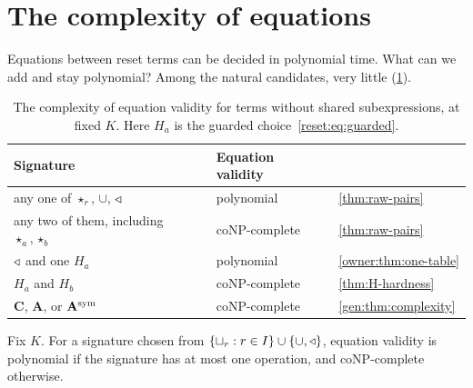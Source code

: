 \section{The complexity of equations}\label{sec:complexity}

Equations between reset terms can be decided in polynomial time. What can we add and stay polynomial? Among the natural candidates, very little (\cref{tab:complexity}).

\begin{table}[ht]
\centering
\begin{tabular}{lll}
\toprule
Signature & Equation validity & \\
\midrule
any one of $\star_r$, $\cup$, $\mathbin{\triangleleft}$ & polynomial & \cref{thm:raw-pairs}\\
any two of them, including $\star_a,\star_b$ & coNP-complete & \cref{thm:raw-pairs}\\
$\mathbin{\triangleleft}$ and one $H_a$ & polynomial & \cref{owner:thm:one-table}\\
$H_a$ and $H_b$ & coNP-complete & \cref{thm:H-hardness}\\
$\mathbf C$, $\mathbf A$, or $\mathbf A^{\rm sym}$ & coNP-complete & \cref{gen:thm:complexity}\\
\bottomrule
\end{tabular}
\caption{The complexity of equation validity for terms without shared subexpressions, at fixed $K$. Here $H_a$ is the guarded choice~\eqref{reset:eq:guarded}.}
\label{tab:complexity}
\end{table}

\begin{theorem}\label{thm:raw-pairs}
Fix $K$. For a signature chosen from $\{\sqcup_r:r\in I\}\cup\{\cup,\mathbin{\triangleleft}\}$, equation validity is polynomial if the signature has at most one operation, and coNP-complete otherwise.
\end{theorem}

